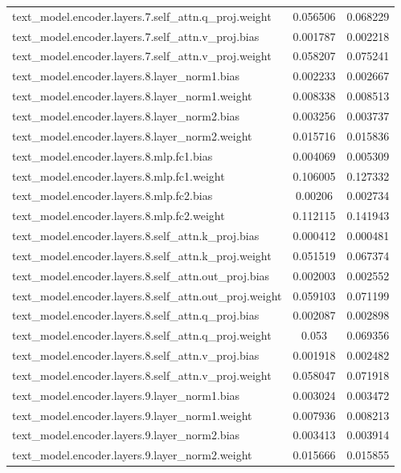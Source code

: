 \begin{longtable}{lcc}
text\_model.encoder.layers.7.self\_attn.q\_proj.weight & 0.056506 & 0.068229 \\
text\_model.encoder.layers.7.self\_attn.v\_proj.bias & 0.001787 & 0.002218 \\
text\_model.encoder.layers.7.self\_attn.v\_proj.weight & 0.058207 & 0.075241 \\
text\_model.encoder.layers.8.layer\_norm1.bias & 0.002233 & 0.002667 \\
text\_model.encoder.layers.8.layer\_norm1.weight & 0.008338 & 0.008513 \\
text\_model.encoder.layers.8.layer\_norm2.bias & 0.003256 & 0.003737 \\
text\_model.encoder.layers.8.layer\_norm2.weight & 0.015716 & 0.015836 \\
text\_model.encoder.layers.8.mlp.fc1.bias & 0.004069 & 0.005309 \\
text\_model.encoder.layers.8.mlp.fc1.weight & 0.106005 & 0.127332 \\
text\_model.encoder.layers.8.mlp.fc2.bias & 0.00206 & 0.002734 \\
text\_model.encoder.layers.8.mlp.fc2.weight & 0.112115 & 0.141943 \\
text\_model.encoder.layers.8.self\_attn.k\_proj.bias & 0.000412 & 0.000481 \\
text\_model.encoder.layers.8.self\_attn.k\_proj.weight & 0.051519 & 0.067374 \\
text\_model.encoder.layers.8.self\_attn.out\_proj.bias & 0.002003 & 0.002552 \\
text\_model.encoder.layers.8.self\_attn.out\_proj.weight & 0.059103 & 0.071199 \\
text\_model.encoder.layers.8.self\_attn.q\_proj.bias & 0.002087 & 0.002898 \\
text\_model.encoder.layers.8.self\_attn.q\_proj.weight & 0.053 & 0.069356 \\
text\_model.encoder.layers.8.self\_attn.v\_proj.bias & 0.001918 & 0.002482 \\
text\_model.encoder.layers.8.self\_attn.v\_proj.weight & 0.058047 & 0.071918 \\
text\_model.encoder.layers.9.layer\_norm1.bias & 0.003024 & 0.003472 \\
text\_model.encoder.layers.9.layer\_norm1.weight & 0.007936 & 0.008213 \\
text\_model.encoder.layers.9.layer\_norm2.bias & 0.003413 & 0.003914  \\
text\_model.encoder.layers.9.layer\_norm2.weight & 0.015666 & 0.015855 \\

\end{longtable}
